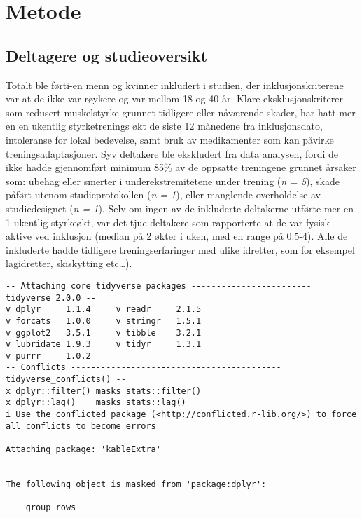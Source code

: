\documentclass[
  letterpaper,
  DIV=11,
  numbers=noendperiod]{scrreprt}
\begin{document}

\chapter{Metode}\label{metode-5}

\section{Deltagere og studieoversikt}\label{deltagere-og-studieoversikt}

Totalt ble førti-en menn og kvinner inkludert i studien, der
inklusjonskriterene var at de ikke var røykere og var mellom 18 og 40
år. Klare eksklusjonskriterer som redusert muskelstyrke grunnet
tidligere eller nåværende skader, har hatt mer en en ukentlig
styrketrenings økt de siste 12 månedene fra inklusjonsdato, intoleranse
for lokal bedøvelse, samt bruk av medikamenter som kan påvirke
treningsadaptasjoner. Syv deltakere ble ekskludert fra data analysen,
fordi de ikke hadde gjennomført minimum 85\% av de oppsatte treningene
grunnet årsaker som: ubehag eller smerter i underekstremitetene under
trening (\emph{n = 5}), skade påført utenom studieprotokollen (\emph{n =
1}), eller manglende overholdelse av studiedesignet (\emph{n = 1}). Selv
om ingen av de inkluderte deltakerne utførte mer en 1 ukentlig
styrkeøkt, var det tjue deltakere som rapporterte at de var fysisk
aktive ved inklusjon (median på 2 økter i uken, med en range på 0.5-4).
Alle de inkluderte hadde tidligere treningserfaringer med ulike
idretter, som for eksempel lagidretter, skiskytting etc\ldots).

\begin{verbatim}
-- Attaching core tidyverse packages ------------------------ tidyverse 2.0.0 --
v dplyr     1.1.4     v readr     2.1.5
v forcats   1.0.0     v stringr   1.5.1
v ggplot2   3.5.1     v tibble    3.2.1
v lubridate 1.9.3     v tidyr     1.3.1
v purrr     1.0.2     
-- Conflicts ------------------------------------------ tidyverse_conflicts() --
x dplyr::filter() masks stats::filter()
x dplyr::lag()    masks stats::lag()
i Use the conflicted package (<http://conflicted.r-lib.org/>) to force all conflicts to become errors

Attaching package: 'kableExtra'


The following object is masked from 'package:dplyr':

    group_rows
\end{verbatim}
\end{document}

